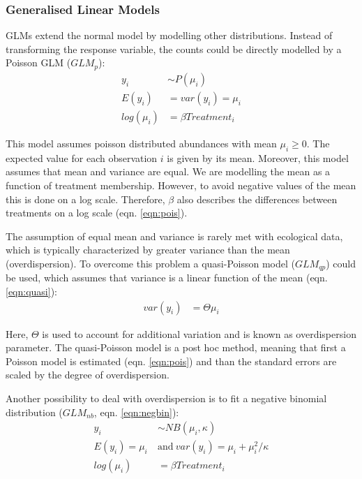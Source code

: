 \documentclass[twocolumn, natbib]{svjour3}
\begin{document}
\subsubsection{Generalised Linear Models}
GLMs extend the normal model by modelling other distributions.
Instead of transforming the response variable, the counts could be directly modelled by a Poisson GLM ($GLM_p$):
\begin{align}
  y_i &\sim P(\mu_i) \nonumber \\
  E(y_i) &= var(y_i) = \mu_i \label{eqn:pois} \\
  log(\mu_i) &= \beta Treatment_i  \nonumber
\end{align}

This model assumes poisson distributed abundances with mean $\mu_i \ge 0$.
The expected value for each observation $i$ is given by its mean. 
Moreover, this model assumes that mean and variance are equal.
We are modelling the mean as a function of treatment membership.
However, to avoid negative values of the mean this is done on a log scale.
Therefore, $\beta$ also describes the differences between treatments on a log scale (eqn. \ref{eqn:pois}).

The assumption of equal mean and variance is rarely met with ecological data, which is typically characterized by greater variance than the mean (overdispersion).
To overcome this problem a quasi-Poisson model ($GLM_{qp}$) could be used, which assumes that variance is a linear function of the mean (eqn. \ref{eqn:quasi}):
\begin{align}
  var(y_i) &= \Theta \mu_i  \label{eqn:quasi}
\end{align}

Here, $\Theta$ is used to account for additional variation and is known as overdispersion parameter.
The quasi-Poisson model is a post hoc method, meaning that first a Poisson model is estimated (eqn. \ref{eqn:pois}) and than the standard errors are scaled by the degree of overdispersion.

Another possibility to deal with overdispersion is to fit a negative binomial distribution ($GLM_{nb}$, eqn. \ref{eqn:negbin}):
\begin{align}
  y_i &\sim NB(\mu_i, \kappa) \nonumber  \\
  E(y_i) = \mu_i ~&\text{and}~var(y_i) = \mu_i + \mu_i^2 / \kappa \label{eqn:negbin} \\
  log(\mu_i) &= \beta Treatment_i  \nonumber 
\end{align}
\end{document}
